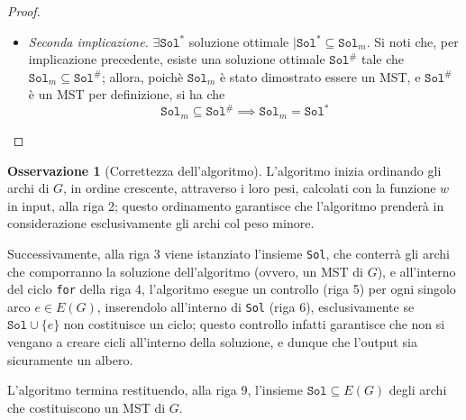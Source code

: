 \documentclass[14pt]{extreport}
\theoremstyle{definition}
\theoremstyle{definition}
\newtheorem{remark}{Osservazione}[subsection]
\begin{document}
\begin{proof}
\begin{itemize}
\begin{itemize}
                \item si noti che, considerando l'insieme di archi $(\texttt{Sol}^* \cup \{e_{k +1}\}) - \{e_j\}$, il vertice $y$ resta coperto
                \item si noti che l'arco $e_j$ non è in $\texttt{Sol}_{k +1}$, e dunque $k + 1 < j$; allora, per via dell'ordinamento degli archi alla riga $2$, necessariamente $w(e_{k +1}) \le w(e_j)$; dunque, si ha che $$\displaystyle \sum_{e \in ((\texttt{Sol}^* \cup \{e_{k +1}\}) - \{e_j\})}{w(e)} \le \sum_{e \in \texttt{Sol}^*}{w(e)}$$ ma poiché $\texttt{Sol}^*$, per definizione, è soluzione ottimale, non è possibile trovare una soluzione con peso inferiore, e dunque necessariamente $$(\texttt{Sol}^* \cup \{e_{k +1}\}) - \{e_j\}$$ ha lo stesso peso di $\texttt{Sol}^*$, che costituisce un MST di $G$; allora, tale insieme di archi è una soluzione ottimale, contenente $\texttt{Sol}_{k +1}$ per definizione.
            \end{itemize}
        \item[] \textit{Seconda implicazione.} $\exists \texttt{Sol}^*$ soluzione ottimale $\mid \texttt{Sol}^* \subseteq \texttt{Sol}_m$. Si noti che, per implicazione precedente, esiste una soluzione ottimale $\texttt{Sol}^\#$ tale che $\texttt{Sol}_m \subseteq \texttt{Sol}^\#$; allora, poichè $\texttt{Sol}_m$ è stato dimostrato essere un MST, e $\texttt{Sol}^\#$ è un MST per definizione, si ha che $$\texttt{Sol}_m \subseteq \texttt{Sol}^\# \implies \texttt{Sol}_m = \texttt{Sol}^*$$
    \end{itemize}
\end{proof}

\begin{remark}[Correttezza dell'algoritmo]
    L'algoritmo inizia ordinando gli archi di $G$, in ordine crescente, attraverso i loro pesi, calcolati con la funzione $w$ in input, alla riga 2; questo ordinamento garantisce che l'algoritmo prenderà in considerazione esclusivamente gli archi col peso minore.

    Successivamente, alla riga 3 viene istanziato l'insieme \texttt{Sol}, che conterrà gli archi che comporranno la soluzione dell'algoritmo (ovvero, un MST di $G$), e all'interno del ciclo \texttt{for} della riga 4, l'algoritmo esegue un controllo (riga 5) per ogni singolo arco $e \in E(G)$, inserendolo all'interno di \texttt{Sol} (riga 6), esclusivamente se $\texttt{Sol} \cup \{e\}$ non costituisce un ciclo; questo controllo infatti garantisce che non si vengano a creare cicli all'interno della soluzione, e dunque che l'output sia sicuramente un albero.

    L'algoritmo termina restituendo, alla riga 9, l'insieme $\texttt{Sol} \subseteq E(G)$ degli archi che costituiscono un MST di $G$.
\end{remark}
\end{document}
